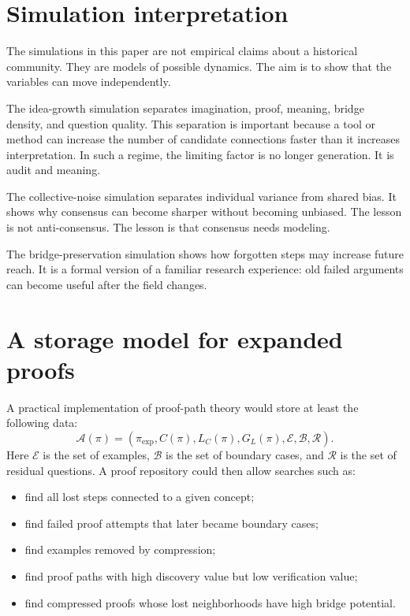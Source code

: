 \documentclass[11pt,oneside]{book}
\theoremstyle{remark}
\begin{document}
\section{Simulation interpretation}

The simulations in this paper are not empirical claims about a historical community.  They are models of possible dynamics.  The aim is to show that the variables can move independently.

The idea-growth simulation separates imagination, proof, meaning, bridge density, and question quality.  This separation is important because a tool or method can increase the number of candidate connections faster than it increases interpretation.  In such a regime, the limiting factor is no longer generation.  It is audit and meaning.

The collective-noise simulation separates individual variance from shared bias.  It shows why consensus can become sharper without becoming unbiased.  The lesson is not anti-consensus.  The lesson is that consensus needs modeling.

The bridge-preservation simulation shows how forgotten steps may increase future reach.  It is a formal version of a familiar research experience: old failed arguments can become useful after the field changes.

\section{A storage model for expanded proofs}

A practical implementation of proof-path theory would store at least the following data:
\[
        \mathcal A(\pi)=
        (\pi_{\mathrm{exp}}, C(\pi), L_C(\pi), G_L(\pi), \mathcal E, \mathcal B, \mathcal R).
\]
Here $\mathcal E$ is the set of examples, $\mathcal B$ is the set of boundary cases, and $\mathcal R$ is the set of residual questions.  A proof repository could then allow searches such as:
\begin{itemize}
\item find all lost steps connected to a given concept;
\item find failed proof attempts that later became boundary cases;
\item find examples removed by compression;
\item find proof paths with high discovery value but low verification value;
\item find compressed proofs whose lost neighborhoods have high bridge potential.
\end{itemize}
\end{document}
